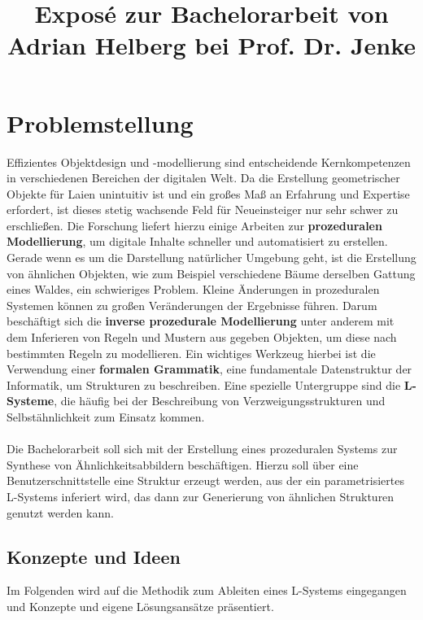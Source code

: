 \documentclass[11pt]{article}
\title{\textbf{Exposé} zur Bachelorarbeit von Adrian Helberg bei Prof. Dr. Jenke}
\begin{document}
    \maketitle

    \section{Problemstellung}

    Effizientes Objektdesign und -modellierung sind entscheidende Kernkompetenzen in verschiedenen Bereichen der
    digitalen Welt.
    Da die Erstellung geometrischer Objekte für Laien unintuitiv ist und ein großes Maß an Erfahrung und Expertise
    erfordert, ist dieses stetig wachsende Feld für Neueinsteiger nur sehr schwer zu erschließen.
    Die Forschung liefert hierzu einige Arbeiten zur \textbf{prozeduralen Modellierung}, um digitale Inhalte schneller
    und automatisiert zu erstellen.
    Gerade wenn es um die Darstellung natürlicher Umgebung geht, ist die Erstellung von ähnlichen Objekten, wie
    zum Beispiel verschiedene Bäume derselben Gattung eines Waldes, ein schwieriges Problem.
    Kleine Änderungen in prozeduralen Systemen können zu großen Veränderungen der Ergebnisse führen.
    Darum beschäftigt sich die \textbf{inverse prozedurale Modellierung} unter anderem mit dem Inferieren von Regeln
    und Mustern aus gegeben Objekten, um diese nach bestimmten Regeln zu modellieren.
    Ein wichtiges Werkzeug hierbei ist die Verwendung einer \textbf{formalen Grammatik}, eine fundamentale Datenstruktur
    der Informatik, um Strukturen zu beschreiben.
    Eine spezielle Untergruppe sind die \textbf{L-Systeme}, die häufig bei der Beschreibung
    von Verzweigungsstrukturen und Selbstähnlichkeit zum Einsatz kommen.\\~\\
    Die Bachelorarbeit soll sich mit der Erstellung eines prozeduralen Systems zur Synthese von Ähnlichkeitsabbildern
    beschäftigen.
    Hierzu soll über eine Benutzerschnittstelle eine Struktur erzeugt werden, aus der ein parametrisiertes L-Systems
    inferiert wird, das dann zur Generierung von ähnlichen Strukturen genutzt werden kann.

    \subsection{Konzepte und Ideen}
    Im Folgenden wird auf die Methodik zum Ableiten eines L-Systems eingegangen und Konzepte und eigene Lösungsansätze
    präsentiert.
\end{document}

